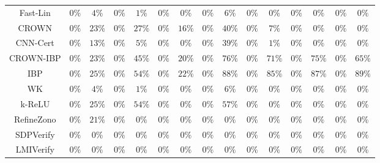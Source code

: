 \begin{table*}
{\begin{tabular}{c|c|c|c|c|c|c|c|c|c|c|c|c|c|c}
     Fast-Lin &         $0\%$ &         $4\%$ &         $0\%$ &         $1\%$ &         $0\%$ &         $0\%$ &         $0\%$ &         $6\%$ &         $0\%$ &         $0\%$ &         $0\%$ &         $0\%$ &         $0\%$ &         $0\%$ \\
        CROWN &         $0\%$ &        $23\%$ &         $0\%$ &        $27\%$ &         $0\%$ &        $16\%$ &         $0\%$ &        $40\%$ &         $0\%$ &         $7\%$ &         $0\%$ &         $0\%$ &         $0\%$ &         $0\%$ \\
     CNN-Cert &         $0\%$ &        $13\%$ &         $0\%$ &         $5\%$ &         $0\%$ &         $0\%$ &         $0\%$ &        $39\%$ &         $0\%$ &         $1\%$ &         $0\%$ &         $0\%$ &         $0\%$ &         $0\%$ \\
    CROWN-IBP &         $0\%$ &        $23\%$ &         $0\%$ &        $45\%$ &         $0\%$ &        $20\%$ &         $0\%$ &        $76\%$ &         $0\%$ &        $71\%$ &         $0\%$ &        $75\%$ &         $0\%$ &        $65\%$ \\
          IBP &         $0\%$ &        $25\%$ &         $0\%$ &        $54\%$ &         $0\%$ &        $22\%$ &         $0\%$ &        $88\%$ &         $0\%$ &        $85\%$ &         $0\%$ &        $87\%$ &         $0\%$ &        $89\%$ \\
           WK &         $0\%$ &         $4\%$ &         $0\%$ &         $1\%$ &         $0\%$ &         $0\%$ &         $0\%$ &         $6\%$ &         $0\%$ &         $0\%$ &         $0\%$ &         $0\%$ &         $0\%$ &         $0\%$ \\
       k-ReLU &         $0\%$ &        $25\%$ &         $0\%$ &        $54\%$ &         $0\%$ &         $0\%$ &         $0\%$ &        $57\%$ &         $0\%$ &         $0\%$ &         $0\%$ &         $0\%$ &         $0\%$ &         $0\%$ \\
   RefineZono &         $0\%$ &        $21\%$ &         $0\%$ &         $0\%$ &         $0\%$ &         $0\%$ &         $0\%$ &         $0\%$ &         $0\%$ &         $0\%$ &         $0\%$ &         $0\%$ &         $0\%$ &         $0\%$ \\
    SDPVerify &         $0\%$ &         $0\%$ &         $0\%$ &         $0\%$ &         $0\%$ &         $0\%$ &         $0\%$ &         $0\%$ &         $0\%$ &         $0\%$ &         $0\%$ &         $0\%$ &         $0\%$ &         $0\%$ \\
    LMIVerify &         $0\%$ &         $0\%$ &         $0\%$ &         $0\%$ &         $0\%$ &         $0\%$ &         $0\%$ &         $0\%$ &         $0\%$ &         $0\%$ &         $0\%$ &         $0\%$ &         $0\%$ &         $0\%$ \\

\end{tabular}}
\end{table*}
